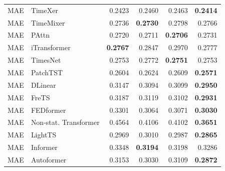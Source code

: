 \begin{longtable}{llrrrr}
MAE & TimeXer & 0.2423 & 0.2460 & 0.2463 & \textbf{0.2414} \\
MAE & TimeMixer & 0.2736 & \textbf{0.2730} & 0.2798 & 0.2766 \\
MAE & PAttn & 0.2720 & 0.2711 & \textbf{0.2706} & 0.2731 \\
MAE & iTransformer & \textbf{0.2767} & 0.2847 & 0.2970 & 0.2777 \\
MAE & TimesNet & 0.2753 & 0.2772 & \textbf{0.2751} & 0.2753 \\
MAE & PatchTST & 0.2604 & 0.2624 & 0.2609 & \textbf{0.2571} \\
MAE & DLinear & 0.3147 & 0.3094 & 0.3099 & \textbf{0.2950} \\
MAE & FreTS & 0.3187 & 0.3119 & 0.3102 & \textbf{0.2931} \\
MAE & FEDformer & 0.3301 & 0.3064 & 0.3071 & \textbf{0.3030} \\
MAE & Non-stat. Transformer & 0.4564 & 0.4106 & 0.4102 & \textbf{0.3651} \\
MAE & LightTS & 0.2969 & 0.3010 & 0.2987 & \textbf{0.2865} \\
MAE & Informer & 0.3348 & \textbf{0.3194} & 0.3198 & 0.3286 \\
MAE & Autoformer & 0.3153 & 0.3030 & 0.3109 & \textbf{0.2872} \\
\end{longtable}
\endgroup

